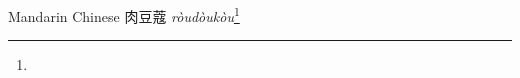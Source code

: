 \begin{etymology}\label{ety:roudoukou}
Mandarin Chinese {肉豆蔻} \textit{ròudòukòu}\footnote{}
\end{etymology}